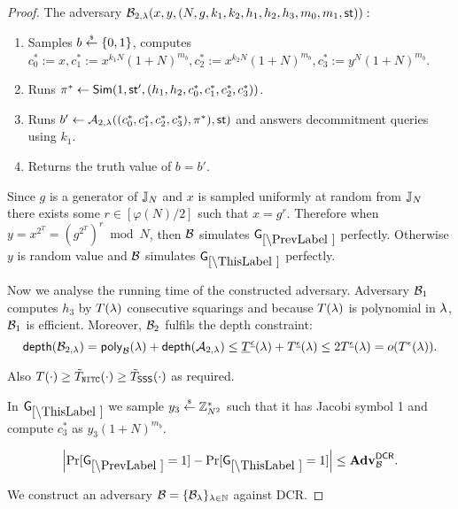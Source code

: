\begin{proof}
The adversary $\mathcal{B}_{2,\lambda}(x,y,(N,g,k_1, k_2, h_1,h_2,h_3, m_0, m_1, \mathsf{st})):$
\vspace{-2mm}
\begin{enumerate}
\item Samples $b \stackrel{{\scriptscriptstyle\$}}{\leftarrow} \{0,1\}$, computes $c_0^*:=x, c_1^*:=x^{k_1N}(1+N)^{m_b}, c_2^*:=x^{k_2N}(1+N)^{m_b}, c_3^*:=y^{N}(1+N)^{m_b}$.
\item Runs $\pi^* \leftarrow \mathsf{Sim}(1, \mathsf{st}', (h_1, h_2, c_0^*, c_1^*, c_2^*, c_3^*))$.
\item Runs $b' \leftarrow \mathcal{A}_{2, \lambda}((c_0^*, c_1^*, c_2^*, c_3^*), \pi^*), \mathsf{st})$ and answers decommitment queries using $k_1$.
\item Returns the truth value of $b=b'$.
\end{enumerate}
Since $g$ is a generator of $\mathbb{J}_N$ and $x$ is sampled uniformly at random from $\mathbb{J}_N$ there exists some $r \in [\varphi(N)/2]$ such that $x = g^{r}$. Therefore when $y = x^{2^T} = (g^{2^T})^{r} \bmod N$, then $\mathcal{B}$ simulates $\games_\prevgame$ perfectly. Otherwise $y$ is random value and $\mathcal{B}$ simulates $\games_\thisgame$ perfectly. 

Now we analyse the running time of the constructed adversary. Adversary $\mathcal{B}_1$ computes $h_3$ by $T(\lambda)$ consecutive squarings and because $T(\lambda)$ is polynomial in $\lambda$, $\mathcal{B}_1$ is efficient. Moreover, $\mathcal{B}_2$ fulfils the depth constraint:
\[ \mathsf{depth}(\mathcal{B}_{2,\lambda}) = \mathsf{poly}_{\mathcal{B}}(\lambda) + \mathsf{depth}(\mathcal{A}_{2,\lambda}) \leq \underline{T}^{\underline{\epsilon}}(\lambda) + T^{\underline{\epsilon}}(\lambda) \leq 2 T^{\underline{\epsilon}}(\lambda) = o(T^{\epsilon}(\lambda)). \] 

Also $T(\cdot) \geq \tilde{T}_{\mathtt{NITC}}(\cdot) \geq \tilde{T}_\mathsf{SSS}(\cdot)$ as required.

%




In $\games_\thisgame$ we sample $y_3 \stackrel{{\scriptscriptstyle\$}}{\leftarrow} \mathbb{Z}_{N^2}^*$ such that it has Jacobi symbol 1 and compute $c_3^*$ as $y_3(1+N)^{m_b}$. 

\begin{lemma}\label{lem:dcr}
\[
\left|\Pr[\games_\prevgame = 1] - \Pr[\games_\thisgame = 1]\right| \leq \advtg_\advB^\dcr.
\]
\end{lemma}
We construct an adversary $\mathcal{B} = \{\mathcal{B}_{\lambda}\}_{\lambda \in \mathbb{N}}$ against DCR.


\end{proof}
